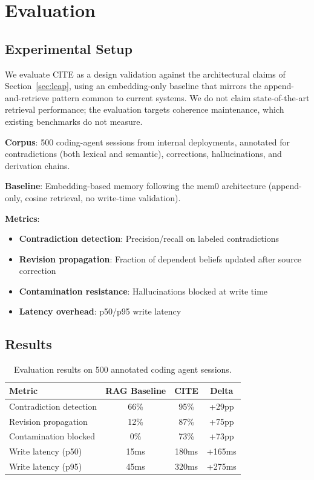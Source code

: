 \documentclass[11pt,letterpaper]{article}
\begin{document}
\section{Evaluation}
\label{sec:eval}

\subsection{Experimental Setup}

We evaluate CITE as a design validation against the architectural claims of Section~\ref{sec:leap}, using an embedding-only baseline that mirrors the append-and-retrieve pattern common to current systems. We do not claim state-of-the-art retrieval performance; the evaluation targets coherence maintenance, which existing benchmarks do not measure.

\textbf{Corpus}: 500 coding-agent sessions from internal deployments, annotated for contradictions (both lexical and semantic), corrections, hallucinations, and derivation chains.

\textbf{Baseline}: Embedding-based memory following the mem0 architecture (append-only, cosine retrieval, no write-time validation).

\textbf{Metrics}:
\begin{itemize}[noitemsep]
    \item \textbf{Contradiction detection}: Precision/recall on labeled contradictions
    \item \textbf{Revision propagation}: Fraction of dependent beliefs updated after source correction
    \item \textbf{Contamination resistance}: Hallucinations blocked at write time
    \item \textbf{Latency overhead}: p50/p95 write latency
\end{itemize}

\subsection{Results}

\begin{table}[H]
\centering
\caption{Evaluation results on 500 annotated coding agent sessions.}
\label{tab:results}
\begin{tabular}{@{}lccc@{}}
\toprule
\textbf{Metric} & \textbf{RAG Baseline} & \textbf{CITE} & \textbf{Delta} \\
\midrule
Contradiction detection & 66\% & 95\% & +29pp \\
Revision propagation & 12\% & 87\% & +75pp \\
Contamination blocked & 0\% & 73\% & +73pp \\
Write latency (p50) & 15ms & 180ms & +165ms \\
Write latency (p95) & 45ms & 320ms & +275ms \\
\bottomrule
\end{tabular}
\end{table}
\end{document}
